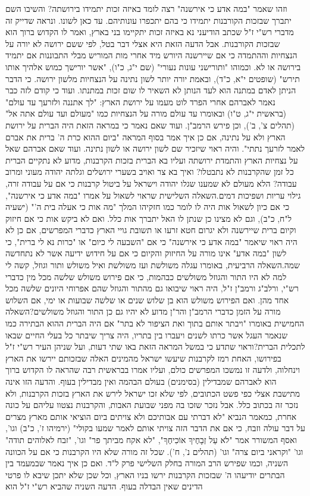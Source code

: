 \documentclass[12pt, openany]{book}
\begin{document}
וזהו שאמר "במה אדע כי אירשנה" רצה לומד באיזה זכות יתמידו בירושתה? והשיבו השם יתברך שבזכות הקורבנות יתמידו כי בהם יתכפרו עונותיהם. עד כאן לשונו. ונראה שדייק זה מדברי רש"י ז"ל שכתב הודיעני נא באיזה זכות יתקיימו בני בארץ, ואמר לו הקדוש ברוך הוא שבזכות הקורבנות. אבל הדעה הזאת היא אצלי דבר בטל, לפי ששם ירושה לא יורה על הנצחיות וההתמדה כי אם שיירשנה היורש מיד אחרי מות המוריש מבלי התבוננות אם יתמיד בירושה או לא. וכמוהו "ותורישני עונות נעורי" (שם י"ג, כ"ו), "אשר יורישך כמוש אלהיך אותו תירש" (שופטים י"א, כ"ד), ובאמת יורה יותר לשון נתינה על הנצחיות מלשון ירושה. כי הדבר הניתן לאדם במתנה הוא לעד הנותן לא השאיר לו שום זכות במתנתו. ועוד כי קודם לזה כבר נאמר לאברהם אחרי הפרד לוט מעמו על ירושת הארץ: "לך אתננה ולזרעך עד עולם" (בראשית י"ג, ט"ו) ובאומרו עד עולם מורה על הנצחיות כמו "מעולם ועד עולם אתה אל" (תהלים צ', ב'), וכן פירש הרמב"ן. ועוד שאם נאמר כי במראה הזאת היה הברית על ירושת הארץ ולא על נתינה, אם כן איך אמר בסוף המראה "ביום ההוא כרת ה' ברית את אברם לאמר  לזרעך נתתי". והיה ראוי שיזכיר שם לשון ירושה או לשון נתינה. ועוד שאם אברהם שאל על נצחיות הארץ והתמדת ירושתה ועליו בא הברית בזכות הקרבנות, מדוע לא נתקיים הברית כל זמן שהקרבנות לא נתבטלו? ואיך בא צר ואויב בשערי ירושלים וגלתה יהודה מעוני ומרוב עבודה? הלא מעולם לא שמענו שגלו יהודה וישראל על ביטול קרבנות כי אם על עבודה זרה, גילוי עריות ושפיכות דמים.השאלה השלישית שראוי לשאול על אמרו "במה אדע כי אירשנה", כי אם כיון לשאול אות היה לו לומר כמו חזקיהו המלך "מה אות כי אעלה בית ה'" (ישעיה ל"ח, כ"ב), וגם לא מצינו כן שנתן לו האל יתברך אות כלל. ואם לא ביקש אות כי אם חיזוק וקיום ברית שיירשנה ולא יגרום חטא זרעו או תשובת גויי הארץ כדברי המפרשים, אם כן לא היה ראוי שיאמר "במה אדע כי אירשנה" כי אם "השבעה לי כיום" או "כרות נא לי ברית", כי לשון "במה אדע" אינו מורה על החיזוק והקיום כי אם על חידוש ידיעה אשר לא נתחדשה שמה.השאלה הרביעית, באומרו עגלה משולשת ועז משולשת ואיל משולש ותור וגוזל, קשה לי למה לא היו התור והגוזל משולשים כבהמות, כי אם פירוש משולש שלשה מכל מין כדברי רש"י, ורלב"ג ורמב"ן ז"ל, היה ראוי שיבואו גם מהתור והגוזל שהם אפרוחי היונים שלשה מכל אחד מהן. ואם הפירוש משולש הוא בן שלוש שנים או שלשה שבועות או ימי, אם השלוש מורה על הזמן כדברי הרמב"ן והר"ן מדוע לא יהיו גם כן התור והגוזל משולשים?השאלה החמישית באומרו "ויבתר אותם בתוך ואת הציפור לא בתר" אם היה הברית ההוא הבתירה כמו שנאמר העגל אשר כרתו לשנים ויעברו בין בתריו, היה צריך שיבתר כל בעלי החיים שבאו לתכלית הברית?וראוי שתדע כי במשל המראה הזאת באו שתי דעות, ועל שניהן העיר רש"י ז"ל בפירושו, האחת רמז לקרבנות שיעשו ישראל מהמינים האלה שבזכותם יירשו את הארץ וינחלוה, ולדעה זו נמשכו המפרשים כולם, ועליו אמרו בבראשית רבה שהראה לו הקדוש ברוך הוא לאברהם שמבדילין (בסימנים) בעולם הבהמה ואין מבדילין בעוף. והדעה הזו אינה מתישבת אצלי כפי פשט הכתובים, לפי שלא זכו ישראל לירש את הארץ בזכות הקרבנות, ולא נזכר זה בכתוב כלל. אבל נזכר שזכו בה מפני שבועת האבות, והקרבנות נצטוו עליהם על כונה אחרת, כמאמר הנביא "לא דברתי עם אבותיכם ולא צויתים ביום הוציאי אותם מארץ מצרים על דבר עולה וזבח, כי אם את הדבר הזה צויתי אותם לאמר שמעו בקולי" (ירמיהו ז', כ"ב) וגו', ואסף המשורר אמר "לֹא עַל זְבָחֶיךָ אוֹכִיחֶךָ", "לא אקח מביתך פר" וגו', "זבח לאלוהים תודה" וגו' "וקראני ביום צרה" וגו' (תהלים נ', ח'). שכל זה מורה שלא היו הקרבנות כי אם על הכוונה השניה, וכמו שפירש הרב המורה בחלק השלישי פרק ל"ד. ואם כן איך נאמר שבמעמד בין הבתרים יודיעהו ה' שבזכות הקרבנות ירשו בניו הארץ, וכל שכן שלא יתכן שיבא לו פרטי הדינים שאין הבדלה בעוף. הדעה השניה שהביא רש"י ז"ל הוא 
\end{document}
